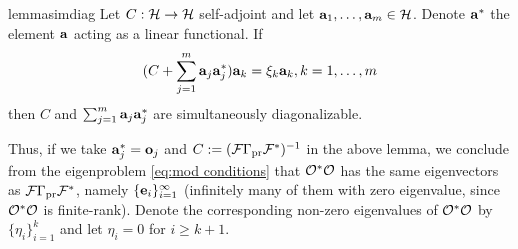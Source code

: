 \documentclass{amsart}
\numberwithin{equation}{section}
\begin{document}
\begin{restatable*}{lemma}{simdiag}\label{lemma:sim diag}
  Let $C:\mathcal{H} \to \mathcal{H}$ self-adjoint and let $\mathbf{a}_1,\dots,\mathbf{a}_m \in
  \mathcal{H}$. Denote $\mathbf{a}^*$ the element $\mathbf{a}$ acting as a linear
  functional. If
  \begin{equation*}
   (C + \sum_{j=1}^m \mathbf{a}_j\mathbf{a}_j^*) \mathbf{a}_k = \xi_k \mathbf{a}_k, k = 1,\dots,m
  \end{equation*}
  then $C$ and $\sum_{j=1}^m \mathbf{a}_j \mathbf{a}_j^*$ are simultaneously
  diagonalizable.
\end{restatable*}

Thus, if we take $\mathbf{a}_j^{*} = \mathbf{o}_j$ and $C := (\mathcal{F} \Gamma_{\textup{pr}}
\mathcal{F}^*)^{-1}$ in the above lemma, we conclude from the eigenproblem
\eqref{eq:mod conditions} that $\mathcal{O}^*\mathcal{O}$ has the same eigenvectors
as $\mathcal{F} \Gamma_{\textup{pr}} \mathcal{F}^*$, namely $\{\mathbf{e}_i\}_{i=1}^{\infty}$ (infinitely
many of them with zero eigenvalue, since $\mathcal{O}^*\mathcal{O}$ is
finite-rank). Denote the corresponding non-zero eigenvalues of
$\mathcal{O}^*\mathcal{O}$ by $\{\eta_i\}_{i=1}^{k}$ and let $\eta_i = 0$ for $i
\geq k+1$. 



\end{document}
